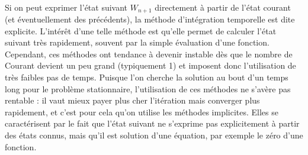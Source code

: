 		\paragraph{}
		Si on peut exprimer l'état suivant $W_{n+1}$ directement à partir de l'état courant (et éventuellement des précédents), la méthode d'intégration temporelle est dite explicite.
		L'intérêt d'une telle méthode est qu'elle permet de calculer l'état suivant très rapidement, souvent par la simple évaluation d'une fonction.
		Cependant, ces méthodes ont tendance à devenir instable dès que le nombre de Courant devient un peu grand (typiquement 1) et imposent donc l'utilisation de très faibles pas de temps.
		Puisque l'on cherche la solution au bout d'un temps long pour le problème stationnaire, l'utilisation de ces méthodes ne s'avère pas rentable : il vaut mieux payer plus cher l'itération mais converger plus rapidement, et c'est pour cela qu'on utilise les méthodes implicites.
		Elles se caractérisent par le fait que l'état suivant ne s'exprime pas explicitement à partir des états connus, mais qu'il est solution d'une équation, par exemple le zéro d'une fonction.
